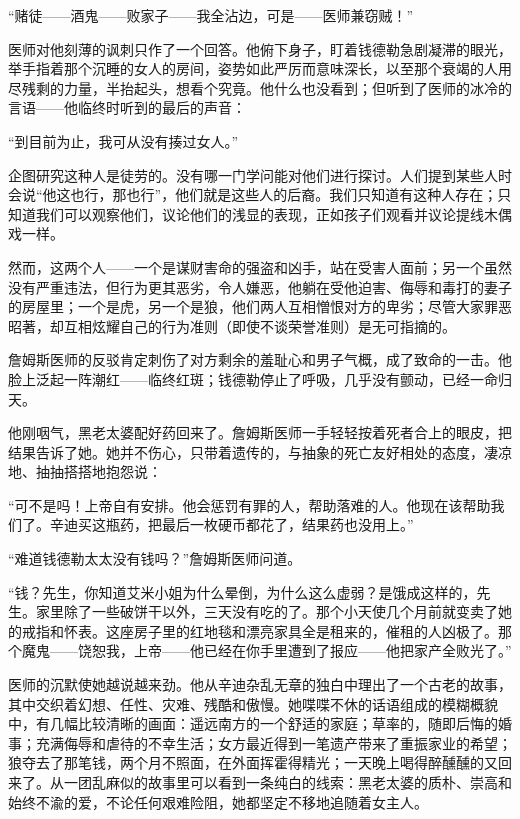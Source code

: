 \documentclass{article}
\begin{document}
“赌徒——酒鬼——败家子——我全沾边，可是——医师兼窃贼！”



医师对他刻薄的讽刺只作了一个回答。他俯下身子，盯着钱德勒急剧凝滞的眼光，举手指着那个沉睡的女人的房间，姿势如此严厉而意味深长，以至那个衰竭的人用尽残剩的力量，半抬起头，想看个究竟。他什么也没看到；但听到了医师的冰冷的言语——他临终时听到的最后的声音：



“到目前为止，我可从没有揍过女人。”



企图研究这种人是徒劳的。没有哪一门学问能对他们进行探讨。人们提到某些人时会说“他这也行，那也行”，他们就是这些人的后裔。我们只知道有这种人存在；只知道我们可以观察他们，议论他们的浅显的表现，正如孩子们观看并议论提线木偶戏一样。



然而，这两个人——一个是谋财害命的强盗和凶手，站在受害人面前；另一个虽然没有严重违法，但行为更其恶劣，令人嫌恶，他躺在受他迫害、侮辱和毒打的妻子的房屋里；一个是虎，另一个是狼，他们两人互相憎恨对方的卑劣；尽管大家罪恶昭著，却互相炫耀自己的行为准则（即使不谈荣誉准则）是无可指摘的。



詹姆斯医师的反驳肯定刺伤了对方剩余的羞耻心和男子气概，成了致命的一击。他脸上泛起一阵潮红——临终红斑；钱德勒停止了呼吸，几乎没有颤动，已经一命归天。



他刚咽气，黑老太婆配好药回来了。詹姆斯医师一手轻轻按着死者合上的眼皮，把结果告诉了她。她并不伤心，只带着遗传的，与抽象的死亡友好相处的态度，凄凉地、抽抽搭搭地抱怨说：



“可不是吗！上帝自有安排。他会惩罚有罪的人，帮助落难的人。他现在该帮助我们了。辛迪买这瓶药，把最后一枚硬币都花了，结果药也没用上。”



“难道钱德勒太太没有钱吗？”詹姆斯医师问道。



“钱？先生，你知道艾米小姐为什么晕倒，为什么这么虚弱？是饿成这样的，先生。家里除了一些破饼干以外，三天没有吃的了。那个小天使几个月前就变卖了她的戒指和怀表。这座房子里的红地毯和漂亮家具全是租来的，催租的人凶极了。那个魔鬼——饶恕我，上帝——他已经在你手里遭到了报应——他把家产全败光了。”



医师的沉默使她越说越来劲。他从辛迪杂乱无章的独白中理出了一个古老的故事，其中交织着幻想、任性、灾难、残酷和傲慢。她喋喋不休的话语组成的模糊概貌中，有几幅比较清晰的画面：遥远南方的一个舒适的家庭；草率的，随即后悔的婚事；充满侮辱和虐待的不幸生活；女方最近得到一笔遗产带来了重振家业的希望；狼夺去了那笔钱，两个月不照面，在外面挥霍得精光；一天晚上喝得醉醺醺的又回来了。从一团乱麻似的故事里可以看到一条纯白的线索：黑老太婆的质朴、崇高和始终不渝的爱，不论任何艰难险阻，她都坚定不移地追随着女主人。
\end{document}
